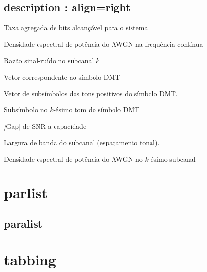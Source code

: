 	\section{description : align=right}
		\begin{description}[labelsep=3em, align=right]
		\setlength\topsep{0.0em}
		\setlength\itemsep{-1.0em}

		\item[$b$] Taxa agregada de bits alcançável para o sistema
		\item[$Sn(f)$] Densidade espectral de potência do AWGN na frequência contínua
		\item[$\text{SNR}_k$] Razão sinal-ruído no subcanal $k$
		\item[$\mathbf{X}$] Vetor correspondente ao símbolo DMT
		\item[$\mathbf{X}_+$] Vetor de subsímbolos dos tons positivos do símbolo DMT.
		\item[$X_k$] Subsímbolo no $k$-ésimo tom do símbolo DMT
		\item[$\Gamma$] \textsl[Gap] de SNR a capacidade
		\item[$\Delta f$] Largura de banda do subcanal (espaçamento tonal).
		\item[$\sigma_k$] Densidade espectral de potência do AWGN no $k$-ésimo subcanal
		\end{description}




	\chapter{parlist}



\section{paralist}





	\chapter{tabbing}




